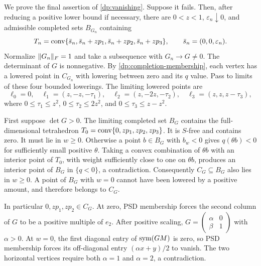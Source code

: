 We prove the final assertion of \cref{dp:vanishing}. Suppose it fails.
Then, after reducing a positive lower bound if necessary, there are
$0<z<1$, $\varepsilon_n\downarrow0$, and admissible completed sets
$B_{G_n}$ containing
\[
 T_n=\operatorname{conv}\{\bar s_n,\bar s_n+zp_1,\bar s_n+zp_2,\bar s_n+zp_3\},
 \qquad\bar s_n=(0,0,\varepsilon_n).
\]
Normalize $\lVert G_n\rVert_F=1$ and take a subsequence with $G_n\to G\ne0$.
The determinant of $G$ is nonnegative. By
\cref{dp:completion-membership}, each vertex has a lowered point in
$C_{G_n}$ with lowering between zero and its $q$ value. Pass to limits of
these four bounded lowerings. The limiting lowered points are
\[
 \ell_0=0,\quad\ell_1=(z,-z,-\tau_1),\quad
 \ell_2=(z,-2z,-\tau_2),\quad\ell_3=(z,z,z-\tau_3),
\]
where $0\le\tau_1\le z^2$, $0\le\tau_2\le2z^2$, and
$0\le\tau_3\le z-z^2$.

First suppose $\det G>0$. The limiting completed set $B_G$ contains
the full-dimensional tetrahedron
$T_0=\operatorname{conv}\{0,zp_1,zp_2,zp_3\}$. It is $S$-free and contains zero.
It must lie in $w\ge0$. Otherwise a point $b\in B_G$ with $b_w<0$
gives $q(\theta b)<0$ for sufficiently small positive $\theta$.
Taking a convex combination of $\theta b$ with an interior point of
$T_0$, with weight sufficiently close to one on $\theta b$, produces
an interior point of $B_G$ in $\{q<0\}$, a contradiction.
Consequently $C_G\subseteq B_G$ also lies in $w\ge0$. A point of
$B_G$ with $w=0$ cannot have been lowered by a positive amount, and
therefore belongs to $C_G$.

In particular $0,zp_1,zp_2\in C_G$. At zero, PSD membership forces
the second column of $G$ to be a positive multiple of $e_2$.
After positive scaling,
$G=\left(\begin{smallmatrix}\alpha&0\\\beta&1\end{smallmatrix}\right)$
with $\alpha>0$. At $w=0$, the first diagonal entry of
$\operatorname{sym}(GM)$ is zero, so PSD membership forces its off-diagonal entry
$(\alpha x+y)/2$ to vanish. The two horizontal vertices require both
$\alpha=1$ and $\alpha=2$, a contradiction.

